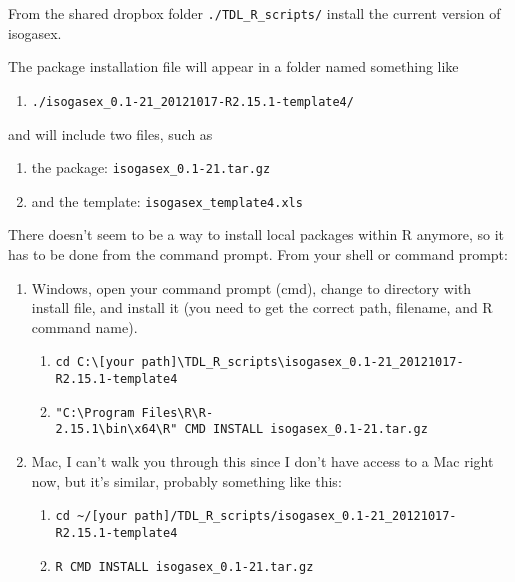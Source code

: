 \documentclass[]{article}
\providecommand{\tightlist}{%
  \setlength{\itemsep}{0pt}\setlength{\parskip}{0pt}}
\begin{document}
From the shared dropbox folder \texttt{./TDL\_R\_scripts/} install the
current version of isogasex.

The package installation file will appear in a folder named something
like

\begin{enumerate}
\def\labelenumi{\arabic{enumi}.}
\tightlist
\item
  \texttt{./isogasex\_0.1-21\_20121017-R2.15.1-template4/}
\end{enumerate}

and will include two files, such as

\begin{enumerate}
\def\labelenumi{\arabic{enumi}.}
\tightlist
\item
  the package: \texttt{isogasex\_0.1-21.tar.gz}
\item
  and the template: \texttt{isogasex\_template4.xls}
\end{enumerate}

There doesn't seem to be a way to install local packages within R
anymore, so it has to be done from the command prompt. From your shell
or command prompt:

\begin{enumerate}
\def\labelenumi{\arabic{enumi}.}
\item
  Windows, open your command prompt (cmd), change to directory with
  install file, and install it (you need to get the correct path,
  filename, and R command name).

  \begin{enumerate}
  \def\labelenumii{\arabic{enumii}.}
  \tightlist
  \item
    \texttt{cd\ C:\textbackslash{}{[}your\ path{]}\textbackslash{}TDL\_R\_scripts\textbackslash{}isogasex\_0.1-21\_20121017-R2.15.1-template4}
  \item
    \texttt{"C:\textbackslash{}Program\ Files\textbackslash{}R\textbackslash{}R-2.15.1\textbackslash{}bin\textbackslash{}x64\textbackslash{}R"\ CMD\ INSTALL\ isogasex\_0.1-21.tar.gz}
  \end{enumerate}
\item
  Mac, I can't walk you through this since I don't have access to a Mac
  right now, but it's similar, probably something like this:

  \begin{enumerate}
  \def\labelenumii{\arabic{enumii}.}
  \tightlist
  \item
    \texttt{cd\ \textasciitilde{}/{[}your\ path{]}/TDL\_R\_scripts/isogasex\_0.1-21\_20121017-R2.15.1-template4}
  \item
    \texttt{R\ CMD\ INSTALL\ isogasex\_0.1-21.tar.gz}
  \end{enumerate}
\end{enumerate}
\end{document}
